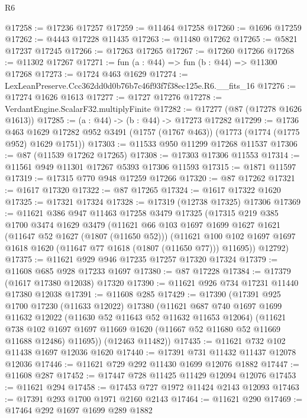 \begin{lexlean}{R6}
\begin{coremodule}
@17258 := @17236 @17257
@17259 := @11464 @17258
@17260 := @1696 @17259
@17262 := @4443 @17228 @11435
@17263 := @11480 @17262
@17265 := @5821 @17237 @17245
@17266 := @17263 @17265
@17267 := @17260 @17266
@17268 := @11302 @17267
@17271 := fun (a : @44) => fun (b : @44) => @11300 @17268
@17273 := @1724 @463 @1629
@17274 := LexLeanPreserve.Ccc362dd0d0b76b7c46f93f7f38ec125e.R6.__fits_16
@17276 := @17274 @1626 @1613
@17277 := @1727 @17276
@17278 := VerdantEngine.ScalarF32.multiplyFinite
@17282 := @17277 (@87 (@17278 @1626 @1613))
@17285 := (a : @44) -> (b : @44) -> @17273 @17282
@17299 := @1736
    @463
    @1629
    @17282
    @952
    @3491
    (@1757 (@1767 @463))
    (@1773 (@1774 (@1775 @952) @1629 @1751))
@17303 := @11533 @950 @11299 @17268 @11537
@17306 := @87 (@11539 @17262 @17265)
@17308 := @17303 @17306 @11553
@17314 := @11561 @949 @11301 @17267 @5393 @17306 @11593
@17315 := @1871 @11597
@17319 := @17315 @770 @948 @17259 @17266
@17320 := @87 @17262
@17321 := @1617 @17320
@17322 := @87 @17265
@17324 := @1617 @17322 @1620
@17325 := @17321 @17324
@17328 := @17319 (@12738 @17325) @17306
@17369 := @11621
    @386
    @947
    @11463
    @17258
    @3479
    @17325
    (@17315
      @219
      @385
      @1700
      @3474
      @1629
      @3479
      (@11621
        @66
        @103
        @1697
        @1699
        @1627
        @1621
        (@11647 @52 @1627 (@1807 (@11650 @52)))
        (@11621 @100 @102 @1697 @1697 @1618 @1620 (@11647 @77 @1618 (@1807 (@11650 @77))) @11695))
      @12792)
@17375 := @11621 @929 @946 @17235 @17257 @17320 @17324
@17379 := @11608 @685 @928 @17233 @1697
@17380 := @87 @17228
@17384 := @17379 (@1617 @17380 @12038) @17320
@17390 := @11621 @926 @734 @17231 @11440 @17380 @12038
@17391 := @11608 @285
@17429 := @17390
    (@17391
      @925
      @1700
      @17230
      (@11633 @12022)
      @17380
      (@11621
        @687
        @740
        @1697
        @1699
        @11632
        @12022
        (@11630 @52 @11643 @52 @11632 @11653 @12064)
        (@11621
          @738
          @102
          @1697
          @1697
          @11669
          @1620
          (@11667 @52 @11680 @52 @11669 @11688 @12486)
          @11695))
      (@12463 @11482))
@17435 := @11621 @732 @102 @11438 @1697 @12036 @1620
@17440 := @17391 @731 @11432 @11437 @12078 @12036
@17446 := @11621 @729 @292 @11430 @1699 @12076 @1882
@17447 := @11608 @287
@17452 := @17447 @728 @11425 @11429 @12094 @12076
@17453 := @11621 @294
@17458 := @17453 @727 @1972 @11424 @2143 @12093
@17463 := @17391 @293 @1700 @1971 @2160 @2143
@17464 := @11621 @290
@17469 := @17464 @292 @1697 @1699 @289 @1882

\end{coremodule}
\end{lexlean}
